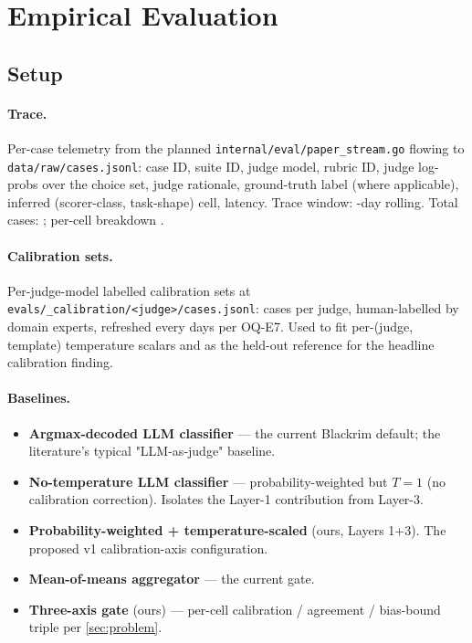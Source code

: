 \section{Empirical Evaluation}
\label{sec:eval}


\subsection{Setup}

\paragraph{Trace.}
Per-case telemetry from the planned
\texttt{internal/eval/paper\_stream.go} flowing to
\texttt{data/raw/cases.jsonl}: case ID, suite ID, judge model,
rubric ID, judge log-probs over the choice set, judge rationale,
ground-truth label (where applicable), inferred (scorer-class,
task-shape) cell, latency. Trace window: -day rolling.
Total cases: ; per-cell breakdown
.

\paragraph{Calibration sets.}
Per-judge-model labelled calibration sets at
\texttt{evals/\_calibration/<judge>/cases.jsonl}: 
cases per judge, human-labelled by domain experts, refreshed every
 days per OQ-E7. Used to fit per-(judge, template)
temperature scalars and as the held-out reference for the headline
calibration finding.

\paragraph{Baselines.}
\begin{itemize}[leftmargin=*]
  \item \textbf{Argmax-decoded LLM classifier} --- the current Blackrim
        default; the literature's typical "LLM-as-judge" baseline.
  \item \textbf{No-temperature LLM classifier} --- probability-weighted
        but $T = 1$ (no calibration correction). Isolates the
        Layer-1 contribution from Layer-3.
  \item \textbf{Probability-weighted + temperature-scaled} (ours,
        Layers 1+3). The proposed v1 calibration-axis configuration.
  \item \textbf{Mean-of-means aggregator} --- the current gate.
  \item \textbf{Three-axis gate} (ours) --- per-cell calibration /
        agreement / bias-bound triple per \cref{sec:problem}.
\end{itemize}

